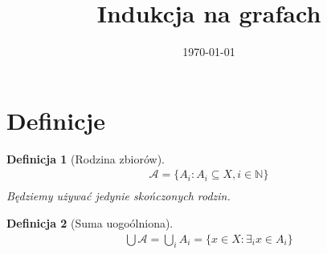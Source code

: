 \documentclass[paper=a4, fontsize=11pt]{article}
\title{	
\huge Indukcja na grafach
}
\date{\normalsize\today}
\begin{document}
\maketitle

\newtheorem{mydef}{Definicja}
\newtheorem{theorem}{Twierdzenie}
\newtheorem{lemma}{Lemat}

\section{Definicje}
\begin{mydef}[Rodzina zbiorów]
\begin{gather*}
\mathcal{A} = \{ A_i : A_i \subseteq X, i \in \mathbb{N} \} \\
\end{gather*}
Będziemy używać jedynie skończonych rodzin.
\end{mydef}
\begin{mydef}[Suma uogoólniona] 
\begin{gather*}
\bigcup \mathcal{A} = \bigcup_i A_i = \{ x \in X : \exists_i x \in A_i \}
\end{gather*}
\end{mydef}
\end{document}
